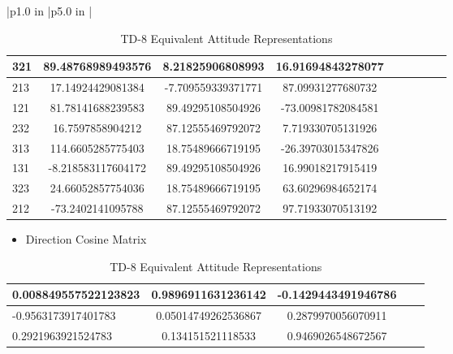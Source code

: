 \begin{table}[htbp!]
\begin{tabular}{|p{1.0 in} |p{5.0 in} |}
\begin{centering}
\begin{tabular}{|l|c|c|c|c|c|c|c|c|}
             321 & 89.48768989493576   &   8.21825906808993    &   16.91694843278077  \\ \hline
             213 & 17.14924429081384   &   -7.709559339371771  &   87.09931277680732  \\ \hline
             121 & 81.78141688239583   &   89.49295108504926   &   -73.00981782084581 \\ \hline
             232 & 16.7597858904212    &   87.12555469792072   &   7.719330705131926  \\ \hline
             313 & 114.6605285775403   &   18.75489666719195   &   -26.39703015347826  \\ \hline
             131 & -8.218583117604172  &   89.49295108504926   &   16.99018217915419   \\ \hline
             323 & 24.66052857754036   &   18.75489666719195   &   63.60296984652174   \\ \hline
             212 & -73.2402141095788   &   87.12555469792072   &   97.71933070513192    \\ \hline 
          \end{tabular}
          \end{centering} 
          \begin{itemize}
              \item Direction Cosine Matrix
          \end{itemize}
            \begin{centering}
            \hspace{0.25 in}
            \begin{tabular}{|l|c|c|c|c|}
             \hline
             0.008849557522123823 &  0.9896911631236142  &   -0.1429443491946786   \\ \hline
            -0.9563173917401783   & 0.05014749262536867  &  0.2879970056070911    \\ \hline
             0.2921963921524783   &  0.134151521118533  &    0.9469026548672567    \\ \hline
          \end{tabular}\\
          \end{centering} 
         \\ \hline
\end{tabular}
   \label{Table:TD-8}
   \caption{TD-8 Equivalent Attitude Representations}
\end{table} 